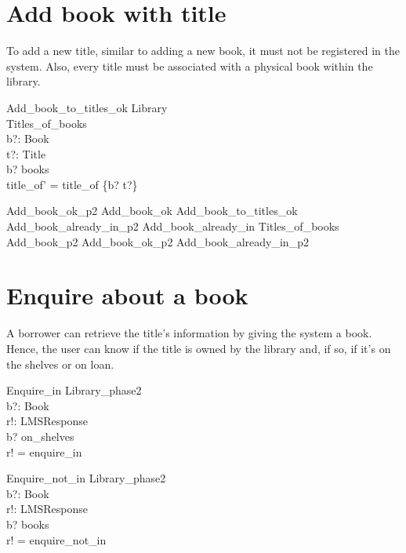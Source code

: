 \documentclass[11pt, fuzz]{article}
\begin{document}
\section{Add book with title}

To add a new title, similar to adding a new book, it must not be registered in the system. Also, every title must be associated with a physical book within the library. 

\begin{schema}{Add\_book\_to\_titles\_ok}
    \Xi Library              \\
    \Delta Titles\_of\_books \\
    b?: Book                 \\
    t?: Title                \\
\where
    b? \notin books                             \\
    title\_of' = title\_of \cup \{b? \mapsto t?\} \\
\end{schema}

\begin{zed}
    Add\_book\_ok\_p2  Add\_book\_ok \land Add\_book\_to\_titles\_ok
\also
    Add\_book\_already\_in\_p2  Add\_book\_already\_in \land \Xi Titles\_of\_books
\also
    Add\_book\_p2  Add\_book\_ok\_p2 \lor Add\_book\_already\_in\_p2 
\end{zed}


\section{Enquire about a book}

A borrower can retrieve the title's information by giving the system a book. Hence, the user can know if the title is owned by the library and, if so, if it's on the shelves or on loan. 

\begin{schema}{Enquire\_in}
    \Xi Library\_phase2  \\
    b?: Book              \\
    r!: LMSResponse       \\
\where
    b? \in on\_shelves    \\
    r! = enquire\_in      \\
\end{schema}

\begin{schema}{Enquire\_not\_in}
    \Xi Library\_phase2  \\
    b?: Book              \\
    r!: LMSResponse       \\
\where
    b? \notin books       \\
    r! = enquire\_not\_in \\
\end{schema}
\end{document}
